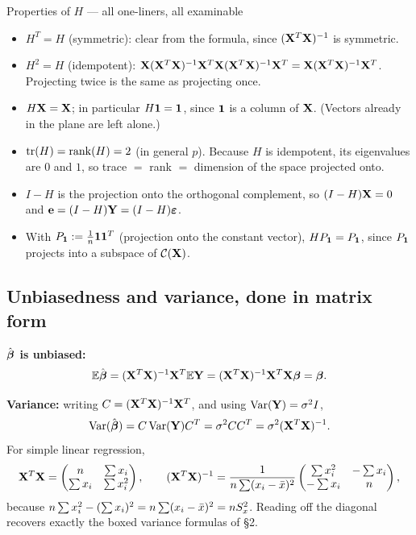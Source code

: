 \documentclass[11pt]{article}
\begin{document}
\begin{recipe}{Properties of $H$ --- all one-liners, all examinable}
\begin{itemize}
  \item $H^T=H$ (symmetric): clear from the formula, since $(\mathbf{X}^T\mathbf{X})^{-1}$ is symmetric.
  \item $H^2=H$ (idempotent): $\mathbf{X}(\mathbf{X}^T\mathbf{X})^{-1}\mathbf{X}^T\mathbf{X}(\mathbf{X}^T\mathbf{X})^{-1}\mathbf{X}^T = \mathbf{X}(\mathbf{X}^T\mathbf{X})^{-1}\mathbf{X}^T$.
        Projecting twice is the same as projecting once.
  \item $H\mathbf{X}=\mathbf{X}$; in particular $H\mathbf{1}=\mathbf{1}$, since $\mathbf{1}$ is a column of $\mathbf{X}$.
        (Vectors already in the plane are left alone.)
  \item $\operatorname{tr}(H)=\operatorname{rank}(H)=2$ (in general $p$). Because $H$ is idempotent, its eigenvalues are
        $0$ and $1$, so trace $=$ rank $=$ dimension of the space projected onto.
  \item $I-H$ is the projection onto the orthogonal complement, so
        $(I-H)\mathbf{X}=0$ and $\mathbf{e}=(I-H)\mathbf{Y}=(I-H)\boldsymbol{\varepsilon}$.
  \item With $P_{\mathbf{1}}:=\tfrac1n\mathbf{1}\mathbf{1}^T$ (projection onto the constant vector),
        $HP_{\mathbf{1}}=P_{\mathbf{1}}$, since $P_{\mathbf{1}}$ projects into a subspace of $\mathcal{C}(\mathbf{X})$.
\end{itemize}
\end{recipe}

\subsection{Unbiasedness and variance, done in matrix form}

\textbf{$\hat{\boldsymbol{\beta}}$ is unbiased:}
\[
  \mathbb{E}\hat{\boldsymbol{\beta}} = (\mathbf{X}^T\mathbf{X})^{-1}\mathbf{X}^T\mathbb{E}\mathbf{Y} = (\mathbf{X}^T\mathbf{X})^{-1}\mathbf{X}^T\mathbf{X}\boldsymbol{\beta} = \boldsymbol{\beta} .
\]

\textbf{Variance:} writing $C=(\mathbf{X}^T\mathbf{X})^{-1}\mathbf{X}^T$, and using $\operatorname{Var}(\mathbf{Y})=\sigma^2 I$,
\[
  \operatorname{Var}(\hat{\boldsymbol{\beta}})= C\operatorname{Var}(\mathbf{Y})C^T = \sigma^2 CC^T = \sigma^2(\mathbf{X}^T\mathbf{X})^{-1}.
\]
For simple linear regression,
\[
  \mathbf{X}^T\mathbf{X} = \begin{pmatrix} n & \sum x_i\\ \sum x_i & \sum x_i^2\end{pmatrix},
  \qquad
  (\mathbf{X}^T\mathbf{X})^{-1}=\frac{1}{n\sum(x_i-\bar{x})^2}
  \begin{pmatrix} \sum x_i^2 & -\sum x_i\\ -\sum x_i & n\end{pmatrix},
\]
because $n\sum x_i^2 - (\sum x_i)^2 = n\sum(x_i-\bar{x})^2 = nS_x^2$. Reading off the
diagonal recovers exactly the boxed variance formulas of \S2.
\end{document}
